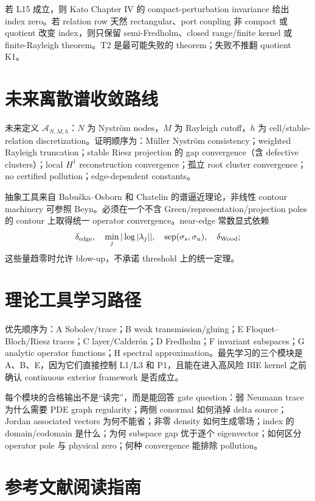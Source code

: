 \documentclass[UTF8,11pt,fontset=none]{ctexart}
\theoremstyle{definition}
\begin{document}
若 L15 成立，则 Kato Chapter IV 的 compact-perturbation invariance 给出 index zero\cite{Kato1995}。若 relation row 天然 rectangular、port coupling 非 compact 或 quotient 改变 index，则只保留 semi-Fredholm、closed range/finite kernel 或 finite-Rayleigh theorem。T2 是最可能失败的 theorem；失败不推翻 quotient K1。

\section{未来离散谱收敛路线}

未来定义 $\mathcal A_{N,M,h}$：$N$ 为 Nyström nodes，$M$ 为 Rayleigh cutoff，$h$ 为 cell/stable-relation discretization。证明顺序为：Müller Nyström consistency；weighted Rayleigh truncation；stable Riesz projection 的 gap convergence（含 defective clusters）；local $H^1$ reconstruction convergence；孤立 root cluster convergence；no certified pollution；edge-dependent constants。

抽象工具来自 Babuška--Osborn 和 Chatelin 的谱逼近理论\cite{BabuskaOsborn1991,Chatelin2011}，非线性 contour machinery 可参照 Beyn\cite{Beyn2012}。必须在一个不含 Green/representation/projection poles 的 contour 上取得统一 operator convergence。near-edge 常数显式依赖
\[
\delta_{\rm edge},\quad\min_j|\log|\lambda_j||,\quad
\operatorname{sep}(\sigma_s,\sigma_u),\quad\delta_{\rm Wood};
\]
这些量趋零时允许 blow-up，不承诺 threshold 上的统一定理。

\section{理论工具学习路径}

优先顺序为：A Sobolev/trace；B weak transmission/gluing；E Floquet--Bloch/Riesz traces；C layer/Calderón；D Fredholm；F invariant subspaces；G analytic operator functions；H spectral approximation。最先学习的三个模块是 A、B、E，因为它们直接控制 L1/L3 和 P1，且能在进入高风险 BIE kernel 之前确认 continuous exterior framework 是否成立。

每个模块的合格输出不是“读完”，而是能回答 gate question：弱 Neumann trace 为什么需要 PDE graph regularity；两侧 conormal 如何消掉 delta source；Jordan associated vectors 为何不能省；非零 density 如何生成零场；index 的 domain/codomain 是什么；为何 subspace gap 优于逐个 eigenvector；如何区分 operator pole 与 physical zero；何种 convergence 能排除 pollution。

\section{参考文献阅读指南}
\end{document}
